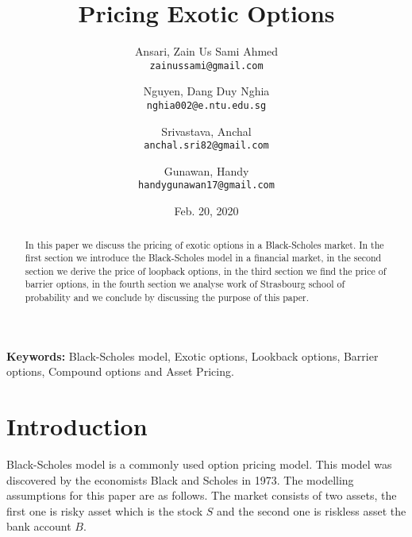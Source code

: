 \documentclass{article}
\begin{document}
\nocite{*} %

\title{Pricing Exotic Options}

\author{
  Ansari, Zain Us Sami Ahmed\\
  \texttt{zainussami@gmail.com}
  \and
  Nguyen, Dang Duy Nghia \\
  \texttt{nghia002@e.ntu.edu.sg}  
    \and
  Srivastava, Anchal \\
  \texttt{anchal.sri82@gmail.com}  
        \and
  Gunawan, Handy \\
  \texttt{handygunawan17@gmail.com}  
}

\date{Feb. 20, 2020} %

\maketitle

\noindent
\textbf{Keywords:} Black-Scholes model, Exotic options,  Lookback options, Barrier options, Compound options
 and Asset Pricing.



\begin{abstract}
In this paper we discuss the pricing of exotic options in a Black-Scholes market.  In the first section we introduce the Black-Scholes model in a financial market, in the second section we derive the price of loopback options, in the third section we find the price of barrier options,  in the fourth section we analyse work of Strasbourg school of probability and we conclude by discussing the purpose of this paper.  
\end{abstract}

\section{Introduction
}

Black-Scholes model is a commonly used option pricing model. This model was discovered by the economists Black and Scholes \cite{BS1} in 1973.  The modelling assumptions for this paper are as follows.  The market consists of two assets, the first one is risky asset which is the stock $S$ and the second one is riskless asset the bank account $B$. \\
\end{document}
